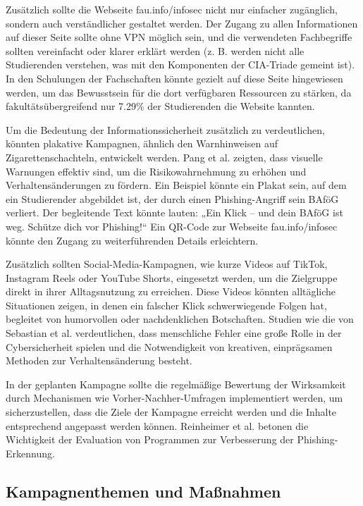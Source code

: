 \documentclass[german,report]{i1thesis}
\begin{document}
Zusätzlich sollte die Webseite fau.info/infosec nicht nur einfacher zugänglich, sondern auch verständlicher
gestaltet werden. Der Zugang zu allen Informationen auf dieser Seite sollte ohne VPN möglich sein, und die verwendeten Fachbegriffe sollten vereinfacht oder klarer erklärt werden
(z. B. werden nicht alle Studierenden verstehen, was mit den Komponenten der CIA-Triade gemeint ist). In den Schulungen der Fachschaften könnte gezielt auf diese Seite hingewiesen werden, um das Bewusstsein für die dort verfügbaren Ressourcen zu stärken, da fakultätsübergreifend nur 7.29\% der Studierenden die Website kannten.

Um die Bedeutung der Informationssicherheit zusätzlich zu verdeutlichen, könnten plakative Kampagnen, ähnlich den Warnhinweisen auf Zigarettenschachteln, entwickelt werden. Pang et al. \cite{pang2021graphicwarnings} zeigten, dass visuelle Warnungen effektiv sind, um die Risikowahrnehmung zu erhöhen und Verhaltensänderungen zu fördern. Ein Beispiel könnte ein Plakat sein, auf dem ein Studierender abgebildet ist, der durch einen Phishing-Angriff sein BAföG verliert. Der begleitende Text könnte lauten: „Ein Klick – und dein BAföG ist weg. Schütze dich vor Phishing!“ Ein QR-Code zur Webseite fau.info/infosec könnte den Zugang zu weiterführenden Details erleichtern.

Zusätzlich sollten Social-Media-Kampagnen, wie kurze Videos auf TikTok, Instagram Reels oder YouTube Shorts, eingesetzt werden, um die Zielgruppe direkt in ihrer Alltagsnutzung zu erreichen. Diese Videos könnten alltägliche Situationen zeigen, in denen ein falscher Klick schwerwiegende Folgen hat, begleitet von humorvollen oder nachdenklichen Botschaften. Studien wie die von Sebastian et al. \cite{sebastian2021rethinking} verdeutlichen, dass menschliche Fehler eine große Rolle in der Cybersicherheit spielen und die Notwendigkeit von kreativen, einprägsamen Methoden zur Verhaltensänderung besteht.

In der geplanten Kampagne sollte die regelmäßige Bewertung der Wirksamkeit durch Mechanismen wie Vorher-Nachher-Umfragen implementiert werden, um sicherzustellen, dass die Ziele der Kampagne erreicht werden und die Inhalte entsprechend angepasst werden können. Reinheimer et al. \cite{reinheimer2020investigation} betonen die Wichtigkeit der Evaluation von Programmen zur Verbesserung der Phishing-Erkennung.

\subsection{Kampagnenthemen und Maßnahmen}
\end{document}
